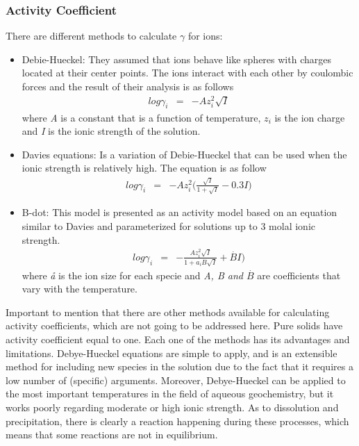 \subsubsection{Activity Coefficient} 
There are different methods to calculate $\gamma$ for ions:
\begin{itemize}
\item Debie-Hueckel: They assumed that ions behave like spheres with charges located at their center points. The ions interact with each other by coulombic forces and the result of their analysis is as follows
\begin{eqnarray} \label{eq:debyeEq}
log \gamma_i &=& - Az_i^2\sqrt{I}
\end{eqnarray} 
where \emph{A} is a constant that is a function of temperature, \emph{$z_i$} is the ion charge and \emph{I} is the ionic strength of the solution.
\item Davies equations: Is a variation of Debie-Hueckel that can be used when the ionic strength is relatively high. The equation is as follow
\begin{eqnarray} \label{eq:daviesEq}
log \gamma_i &=& - Az_i^2 \bigg(\frac{\sqrt{I}}{1+\sqrt{I}} - 0.3 I)
\end{eqnarray}
\item B-dot: This model is presented as an activity model based on an equation similar to Davies and parameterized for solutions up to 3 molal ionic strength.
\begin{eqnarray} \label{eq:bdotEq}
log \gamma_i &=& - \frac{Az_i^2 \sqrt{I}}{1+ a_i B \sqrt{I}} + \overset{.}{B} I )
\end{eqnarray}
where \emph{\aa}  is the ion size for each specie and \emph{A, B and $\overset{.}{B}$} are coefficients that vary with the temperature.
\end{itemize}
Important to mention that there are other methods available for calculating activity coefficients, which are not going to be addressed here. Pure solids have activity coefficient equal to one. Each one of the methods has its advantages and limitations. Debye-Hueckel equations are simple to apply, and is an extensible method for including new species in the solution due to the fact that it requires a low number of (specific) arguments. Moreover, Debye-Hueckel can be applied to the most important temperatures in the field of aqueous geochemistry, but it works poorly regarding moderate or high ionic strength.
As to dissolution and precipitation, there is clearly a reaction happening during these processes, which means that some reactions are not in equilibrium.

